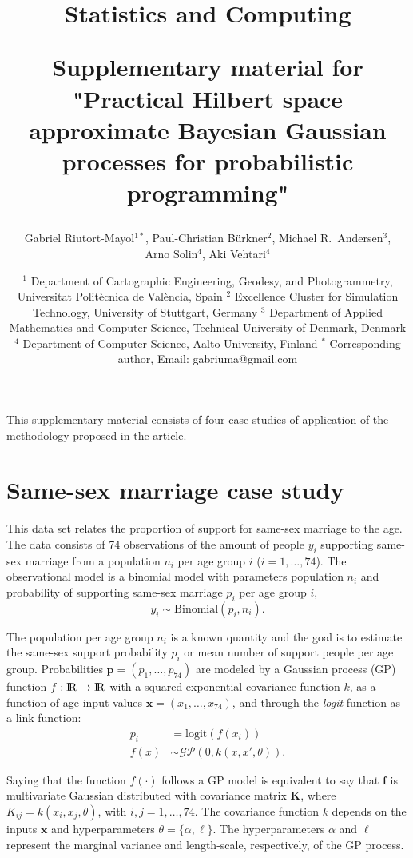 \documentclass[onecolumn,a4paper,11pt]{article}
\title{\begin{flushleft}
\textsf{\small Statistics and Computing}
\end{flushleft}  \vspace{0.5cm}  Supplementary material for "Practical Hilbert space approximate Bayesian Gaussian processes for probabilistic programming"}
\author{Gabriel Riutort-Mayol$^{1*}$, Paul-Christian Bürkner$^2$, Michael R.\ Andersen$^{3}$,\\
  Arno Solin$^{4}$, Aki Vehtari$^{4}$}
\date{ \small
$^1$ Department of Cartographic Engineering, Geodesy, and Photogrammetry, Universitat Polit\`ecnica de Val\`encia, Spain 
\break
$^2$ Excellence Cluster for Simulation Technology, University of Stuttgart, Germany
\break
$^3$ Department of Applied Mathematics and Computer Science, Technical University of Denmark, Denmark
\break
$^4$ Department of Computer Science, Aalto University, Finland
\break
$^*$ Corresponding author, Email: gabriuma@gmail.com
}
\begin{document}
\maketitle

This supplementary material consists of four case studies of application of the methodology proposed in the article.

\tableofcontents

\appendix


\section{Same-sex marriage case study}\label{ch5_sec_studycaseII}
This data set relates the proportion of support for same-sex marriage to the age. The data consists of 74 observations of the amount of people $y_i$ supporting same-sex marriage from a population $n_i$ per age group $i$ ($i=1,\dots,74$). The observational model is a binomial model with parameters population $n_i$ and probability of supporting same-sex marriage $p_i$ per age group $i$,
%
\begin{equation*}
y_i \sim \mathrm{Binomial}(p_i, n_i).
\end{equation*}

\noindent The population per age group $n_i$ is a known quantity and the goal is to estimate the same-sex support probability $p_i$ or mean number of support people per age group. Probabilities $\bm{p}=(p_1,\dots,p_{74})$ are modeled by a Gaussian process (GP) function $f:{\rm I\!R} \to {\rm I\!R}$ with a squared exponential covariance function $k$, as a function of age input values $\bm{x}=(x_1,\dots,x_{74})$, and through the {\it logit} function as a link function:
%
\begin{align*} \label{ch5_eq_gpprior_gay}
p_i &= \mathrm{logit}(f(x_i)) \nonumber \\
f(x) &\sim \mathcal{GP}(0, k(x,x', \theta)).
\end{align*}

\noindent Saying that the function $f(\cdot)$ follows a GP model is equivalent to say that $\bm{f}$ is multivariate Gaussian distributed with covariance matrix $\bm{K}$, where $K_{ij}=k(x_i,x_j,\theta)$, with $i,j=1,\dots,74$. The covariance function $k$ depends on the inputs $\bm{x}$ and hyperparameters $\theta=\{\alpha,\ell\}$. The hyperparameters $\alpha$ and $\ell$ represent the marginal variance and length-scale, respectively, of the GP process.
\end{document}

